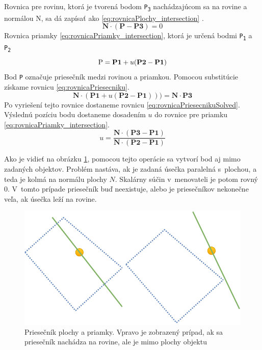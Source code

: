 Rovnica pre rovinu, ktorá je tvorená bodom \texttt{P\textsubscript{3}} nachádzajúcom sa na rovine a normálou N, sa dá zapísať ako \ref{eq:rovnicaPlochy_intersection} \cite{bourke_Point_Line_Plane}. 
\begin{equation}
    \textbf{N} \cdot (\textbf{P} - \textbf{P3}) = 0
	\label{eq:rovnicaPlochy_intersection}
\end{equation}
Rovnica priamky \ref{eq:rovnicaPriamky_intersection}, ktorá je určená bodmi \texttt{P\textsubscript{1}} a \texttt{P\textsubscript{2}}
\begin{equation}
	\textup{P}=\textbf{P1}+u (\textbf{P2}-\textbf{P1})
    \label{eq:rovnicaPriamky_intersection}
\end{equation}
Bod \texttt{P} označuje priesečník medzi rovinou a priamkou. Pomocou substitúcie získame rovnicu \ref{eq:rovnicaPriesecniku}.
\begin{equation}
	\textbf{N} \cdot (\textbf{P1}+u(\textbf{P2}-\textbf{P1}))) = \textbf{N} \cdot \textbf{P3}
    \label{eq:rovnicaPriesecniku}
\end{equation}
Po vyriešení tejto rovnice dostaneme rovnicu \ref{eq:rovnicaPriesecnikuSolved}. Výslednú pozíciu bodu dostaneme dosadením $u$ do rovnice pre  priamku \ref{eq:rovnicaPriamky_intersection}.
\begin{equation}
	u=\frac
{\textbf{N} \cdot (\textbf{P3}-\textbf{P1})}
{\textbf{N} \cdot (\textbf{P2}-\textbf{P1})}
    \label{eq:rovnicaPriesecnikuSolved}
\end{equation}


Ako je vidieť na obrázku \ref{fig:GraphIntersection_Plane_Line}, pomocou tejto operácie sa vytvorí bod aj mimo zadaných objektov. Problém nastáva, ak je zadaná úsečka paralelná s~plochou, a teda je kolmá na normálu plochy $N$. Skalárny súčin v~menovateli je potom rovný 0. V~tomto prípade priesečník buď neexistuje, alebo je priesečníkov nekonečne veľa, ak úsečka leží na rovine.

\begin{figure}[H]
	\centering
	\includegraphics[height=0.3\textwidth]{obrazky-figures/Diagram/Draw/1Points/DP Navrh operacii-0D - PointIntersectionPlaneLine.pdf}
	\caption{Priesečník plochy a priamky. Vpravo je zobrazený prípad, ak sa priesečník nachádza na rovine, ale je mimo plochy objektu}
	\label{fig:GraphIntersection_Plane_Line}
\end{figure}

